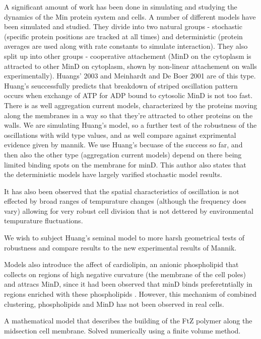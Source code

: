 \documentclass[letterpaper,twocolumn,amsmath,amssymb,pre]{revtex4-1}
\begin{document}
A significant amount of work has been done in simulating and studying
the dynamics of the Min protein system and cells. A number of
different models have been simulated and studied.  They divide into
two natural groups - stochastic (specific protein positions are
tracked at all times) and deterministic (protein averages are used
along with rate constants to simulate interaction). They also split up
into other groups - cooperative attachement (MinD on the cytoplasm is
attracted to other MinD on cytoplasm, shown by non-linear attachement
on walls experimentally).  Huangs' 2003 and Meinhardt and De Boer 2001
are of this type.  Huang's seuccessfully predicts that breakdown of
striped oscillation pattern occurs when exchange of ATP for ADP bound
to cytosolic MinD is not too fast.  There is as well aggregation
current models, characterized by the proteins moving along the
membranes in a way so that they're attracted to other proteins on the
walls.  We are simulating Huang's model, so a further test of the
robustness of the oscillations with wild type values, and as well
compare against exprimental evidence given by mannik.  We use Huang's
becuase of the success so far, and then also the other type
(aggregation current models) depend on there being limited binding
spots on the membrane for minD.  This author also states that the
deterministic models have largely varified stochastic model
results.\cite{kruse2007experimentalist}

It has also been observed that the spatial characteristics of
oscillation is not effected by broad ranges of tempurature changes
(although the frequency does vary) allowing for very robust cell
division that is not dettered by environmental tempurature
fluctuations. \cite{touhami2006temperature}

We wish to subject Huang's seminal model to more harsh geometrical
tests of robustness and compare results to the new experimental
results of Mannik.\cite{mannik2012robustness}

Models also introduce the affect of cardiolipin, an anionic
phospholipid that collects on regions of high negative curvature (the
membrane of the cell poles) and attracs MinD, since it had been
observed that minD binds preferetntially in regions enriched with
these phospholipids \cite{drew2005polymerization}\cite{cytrynbaum2007multistranded}. However, this
mechanism of combined clustering, phospholipids and MinD has not been
observed in real cells.  \cite{halatek2012highly}

A mathematical model that describes the building of the FtZ polymer
along the midsection cell membrane.  Solved numerically using a finite
volume method. \cite{zhang2013mathematical}
\end{document}
